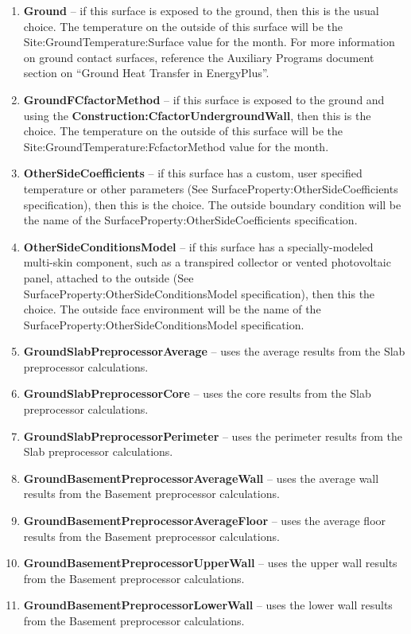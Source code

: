 \begin{enumerate}
  \item
    \textbf{Ground} -- if this surface is exposed to the ground, then this is the usual choice. The temperature on the outside of this surface will be the Site:GroundTemperature:Surface value for the month. For more information on ground contact surfaces, reference the Auxiliary Programs document section on ``Ground Heat Transfer in EnergyPlus''.
  \item
    \textbf{GroundFCfactorMethod} -- if this surface is exposed to the ground and using the \textbf{Construction:CfactorUndergroundWall}, then this is the choice. The temperature on the outside of this surface will be the Site:GroundTemperature:FcfactorMethod value for the month.
  \item
    \textbf{OtherSideCoefficients} -- if this surface has a custom, user specified temperature or other parameters (See SurfaceProperty:OtherSideCoefficients specification), then this is the choice. The outside boundary condition will be the name of the SurfaceProperty:OtherSideCoefficients specification.
  \item
    \textbf{OtherSideConditionsModel} -- if this surface has a specially-modeled multi-skin component, such as a transpired collector or vented photovoltaic panel, attached to the outside (See SurfaceProperty:OtherSideConditionsModel specification), then this the choice. The outside face environment will be the name of the SurfaceProperty:OtherSideConditionsModel specification.
  \item
    \textbf{GroundSlabPreprocessorAverage} -- uses the average results from the Slab preprocessor calculations.
  \item
    \textbf{GroundSlabPreprocessorCore} -- uses the core results from the Slab preprocessor calculations.
  \item
    \textbf{GroundSlabPreprocessorPerimeter} -- uses the perimeter results from the Slab preprocessor calculations.
  \item
    \textbf{GroundBasementPreprocessorAverageWall} -- uses the average wall results from the Basement preprocessor calculations.
  \item
    \textbf{GroundBasementPreprocessorAverageFloor} -- uses the average floor results from the Basement preprocessor calculations.
  \item
    \textbf{GroundBasementPreprocessorUpperWall} -- uses the upper wall results from the Basement preprocessor calculations.
  \item
    \textbf{GroundBasementPreprocessorLowerWall} -- uses the lower wall results from the Basement preprocessor calculations.
\end{enumerate}

